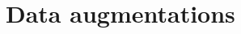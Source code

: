 \clearpage
\appendix
\section{Data augmentations}\label{app:augmentations}

\setcounter{figure}{0}
\setcounter{table}{0}
\renewcommand\thefigure{\thesection\arabic{figure}}
\renewcommand\thetable{\thesection\arabic{table}}

% 
